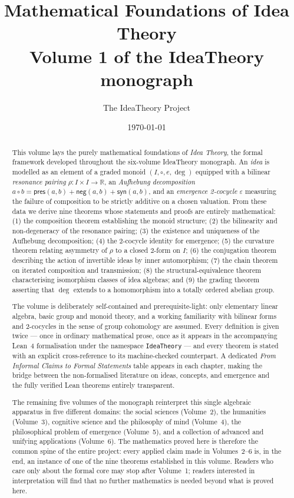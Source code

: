 \documentclass[11pt,oneside]{book}
\title{Mathematical Foundations of Idea Theory\\
\large Volume 1 of the IdeaTheory monograph}
\author{The IdeaTheory Project}
\date{\today}
\begin{document}
\frontmatter
\maketitle

\begin{abstract}
This volume lays the purely mathematical foundations of \emph{Idea Theory},
the formal framework developed throughout the six-volume IdeaTheory
monograph. An \emph{idea} is modelled as an element of a graded monoid
$(I,\circ,e,\deg)$ equipped with a bilinear \emph{resonance pairing}
$\rho : I \times I \to \mathbb{R}$, an \emph{Aufhebung decomposition}
$a \circ b = \mathsf{pres}(a,b) + \mathsf{neg}(a,b) + \mathsf{syn}(a,b)$,
and an \emph{emergence 2-cocycle} $\varepsilon$ measuring the failure of
composition to be strictly additive on a chosen valuation. From these data
we derive nine theorems whose statements and proofs are entirely
mathematical: (1) the composition theorem establishing the monoid
structure; (2) the bilinearity and non-degeneracy of the resonance
pairing; (3) the existence and uniqueness of the Aufhebung decomposition;
(4) the 2-cocycle identity for emergence; (5) the curvature theorem
relating asymmetry of $\rho$ to a closed 2-form on $I$; (6) the
conjugation theorem describing the action of invertible ideas by inner
automorphism; (7) the chain theorem on iterated composition and
transmission; (8) the structural-equivalence theorem characterising
isomorphism classes of idea algebras; and (9) the grading theorem
asserting that $\deg$ extends to a homomorphism into a totally ordered
abelian group.

The volume is deliberately self-contained and prerequisite-light: only
elementary linear algebra, basic group and monoid theory, and a working
familiarity with bilinear forms and 2-cocycles in the sense of group
cohomology are assumed. Every definition is given twice — once in
ordinary mathematical prose, once as it appears in the accompanying
Lean~4 formalisation under the namespace \texttt{IdeaTheory} — and every
theorem is stated with an explicit cross-reference to its machine-checked
counterpart. A dedicated \emph{From Informal Claims to Formal Statements}
table appears in each chapter, making the bridge between the
non-formalised literature on ideas, concepts, and emergence and the
fully verified Lean theorems entirely transparent.

The remaining five volumes of the monograph reinterpret this single
algebraic apparatus in five different domains: the social sciences
(Volume~2), the humanities (Volume~3), cognitive science and the
philosophy of mind (Volume~4), the philosophical problem of emergence
(Volume~5), and a collection of advanced and unifying applications
(Volume~6). The mathematics proved here is therefore the common spine
of the entire project: every applied claim made in Volumes~2--6 is, in
the end, an instance of one of the nine theorems established in this
volume. Readers who care only about the formal core may stop after
Volume~1; readers interested in interpretation will find that no further
mathematics is needed beyond what is proved here.
\end{abstract}
\end{document}
